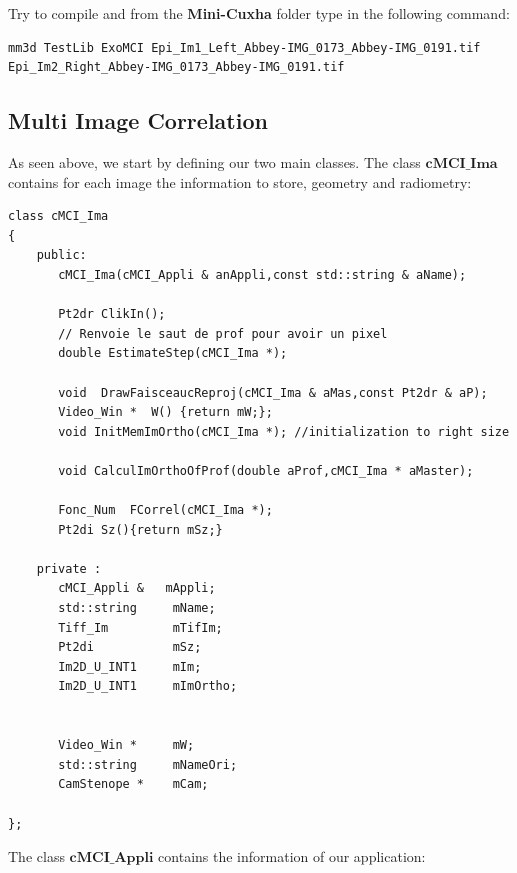 Try to compile and from the \textbf{Mini-Cuxha} folder type in the following command:
\begin{verbatim}
mm3d TestLib ExoMCI Epi_Im1_Left_Abbey-IMG_0173_Abbey-IMG_0191.tif Epi_Im2_Right_Abbey-IMG_0173_Abbey-IMG_0191.tif
\end{verbatim}
\newpage
\subsection{Multi Image Correlation}
As seen above, we start by defining our two main classes. The class $\textbf{cMCI\_Ima}$ contains for each image the information to store, geometry and radiometry:

\begin{verbatim}
class cMCI_Ima
{
    public:
       cMCI_Ima(cMCI_Appli & anAppli,const std::string & aName);

       Pt2dr ClikIn();
       // Renvoie le saut de prof pour avoir un pixel
       double EstimateStep(cMCI_Ima *);

       void  DrawFaisceaucReproj(cMCI_Ima & aMas,const Pt2dr & aP);
       Video_Win *  W() {return mW;};
       void InitMemImOrtho(cMCI_Ima *); //initialization to right size

       void CalculImOrthoOfProf(double aProf,cMCI_Ima * aMaster);

       Fonc_Num  FCorrel(cMCI_Ima *);
       Pt2di Sz(){return mSz;}

    private :
       cMCI_Appli &   mAppli;
       std::string     mName;
       Tiff_Im         mTifIm;
       Pt2di           mSz;
       Im2D_U_INT1     mIm;
       Im2D_U_INT1     mImOrtho;


       Video_Win *     mW;
       std::string     mNameOri;
       CamStenope *    mCam;

};
\end{verbatim}

The class $\textbf{cMCI\_Appli}$ contains the information of our application:

